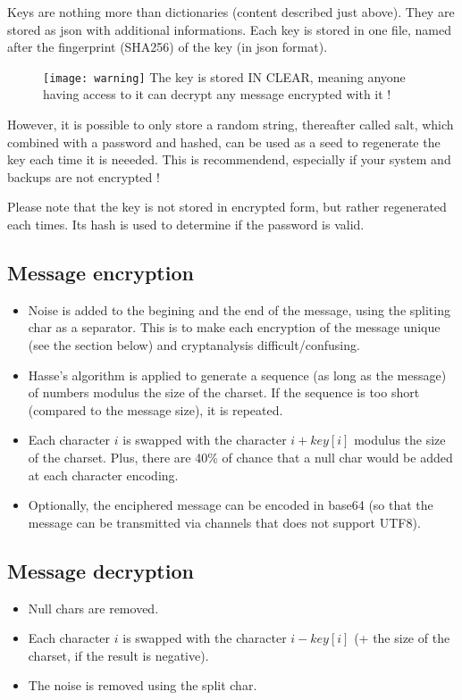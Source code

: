 Keys are nothing more than dictionaries (content described just above). They are stored as json with additional informations. Each 
key is stored in one file, named after the fingerprint (SHA256) of the key (in json format).

\begin{figure}[H]
    \texttt{[image: warning]}
    The key is stored IN CLEAR, meaning anyone having access to it can decrypt any message encrypted with it !
\end{figure}

However, it is possible to only store a random string, thereafter called salt, which combined with a password and hashed, can be used 
as a seed to regenerate the key each time it is neeeded. This is recommendend, especially if your system and backups are not encrypted !

Please note that the key is not stored in encrypted form, but rather regenerated each times. Its hash is used to determine if the password 
is valid.


\subsection{Message encryption}
\begin{itemize}
    \item Noise is added to the begining and the end of the message, using the spliting char as a separator. This is to make each 
          encryption of the message unique (see the section below) and cryptanalysis difficult/confusing.
    \item Hasse's algorithm is applied to generate a sequence (as long as the message) of numbers modulus the size of the charset. If 
          the sequence is too short (compared to the message size), it is repeated.
    \item Each character $i$ is swapped with the character $i + key[i]$ modulus the size of the charset. Plus, there are 40\% of chance 
          that a null char would be added at each character encoding.
    \item Optionally, the enciphered message can be encoded in base64 (so that the message can be transmitted via channels that does not 
          support UTF8).
\end{itemize}

\subsection{Message decryption}
\begin{itemize}
    \item Null chars are removed.
    \item Each character $i$ is swapped with the character $i - key[i]$ (+ the size of the charset, if the result is negative).
    \item The noise is removed using the split char.
\end{itemize}